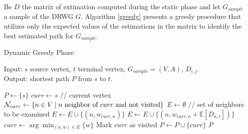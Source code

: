 Be $D$ the matrix of extimation computed during the static phase and let $G_{sample}$ a sample of the DRWG $G$. Algorithm \ref{greedy} presents a greedy procedure that utilizes only the expected values of the estimations in the matrix to identify the best estimated path for $G_{sample}$.

\begin{algorithm}
	\caption{Dynamic Greedy Phase} 
	\label{greedy}
    Input: $s$ source vertex, $t$ terminal vertex, $G_{sample} = (V,A)$, $D_{i,j}$.  \\
    Output: shortest path $P$ from $s$ to $t$.
	\begin{algorithmic}[1]
        \State $P \gets \{s\}$
        \State $curr \gets s$ // current vertex
            \State $\mathcal{N}_{curr} \gets \{n \in V \mid n \linebreak \text{ neighbor of } curr \text{ and not visited}\}$
            \State $E \gets \emptyset$ // set of neighbors to be examined
                    \State $E \gets E \cup \{(n, w_{curr,n})\}$
                \Else
                    \State $E \gets E \cup \{(n, w_{curr,n} + \mathbb{E}[D_{n,t}])\}$
                \EndIf
            \EndFor
            \State $curr \gets \arg\min_{(n,w) \in E} \{w\}$
            \State Mark $curr$ as visited
            \State $P \gets P \cup \{curr\}$
        \EndWhile
        \State \Return $P$
	\end{algorithmic} 
\end{algorithm}
